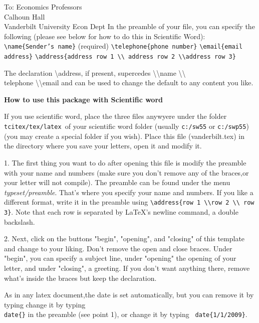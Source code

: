\documentclass{letter}
\begin{document}
\begin{letter}{
To: Economics Professors\\
Calhoun Hall \\
Vanderbilt University Econ Dept}
In the preamble of your file, you can specify the following (please see
below for how to do this in Scientific Word):\newline
\newline
\texttt{\textbackslash name\{Sender's name\}} (required) \newline
\texttt{\textbackslash telephone\{phone number\}} \newline
\texttt{\textbackslash email\{email address\}}\newline
\texttt{\textbackslash address\{address row 1 \textbackslash \textbackslash 
address row 2 \textbackslash \textbackslash  address row 3\}}

The declaration \textbackslash address, if present, supercedes 
\textbackslash \textbackslash name \textbackslash \textbackslash 
\\telephone \textbackslash \textbackslash email and can be used to change the
default to any content you like.\bigskip

\textbf{How to use this package with Scientific word}

If you use scientific word, place the three files anywyere under the folder 
\texttt{tcitex/tex/latex }of
your scientific word folder (usually \texttt{c:/sw55} or \texttt{c:/swp55})
(you may create a special folder if you wish). Place this file
(vanderbilt.tex) in the directory where you save your letters, open it and
modify it.

1. The first thing you want to do after opening this file is modify the
preamble with your name and numbers (make sure you don't remove any of the
braces,or your letter will not compile). The preamble can be found under the
menu \emph{typeset/preamble}. That's where you specify your name and
numbers. If you like a different format, write it in the preamble using 
\texttt{\textbackslash address\{row 1 
 \textbackslash \textbackslash  row 2 \textbackslash \textbackslash 
row 3\}}. Note that each row is separated by LaTeX's newline command, a
double backslash.

2. Next, click on the buttons "begin", "opening", and "closing" of this
template and change to your liking. Don't remove the open and close braces.
Under "begin", you can specify a subject line, under "opening" the opening
of your letter, and under "closing", a greeting. If you don't want anything
there, remove what's inside the braces but keep the declaration.

As in any latex document,the date is set automatically, but you can remove
it by typing change it by typing \texttt{\\date\{\}} in
the preamble (see point 1), or change it by typing \texttt{
date\{1/1/2009\}}.


\end{letter}
\end{document}
